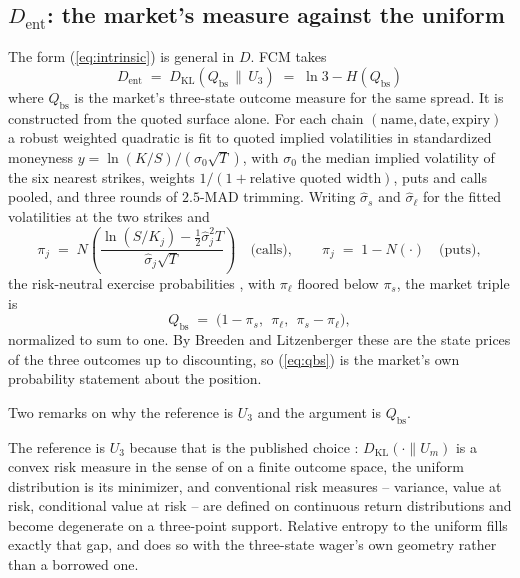 \documentclass[11pt]{article}
\newcommand{\dkl}{D_{\mathrm{KL}}}
\newcommand{\dent}{D_{\mathrm{ent}}}
\newcommand{\Qbs}{Q_{\mathrm{bs}}}
\begin{document}
\subsection{\texorpdfstring{$\dent$}{D-ent}: the market's measure against the
uniform}
\label{sec:dent}

The form (\ref{eq:intrinsic}) is general in $D$. FCM takes
\begin{equation}
\boxed{\ \dent \;=\; \dkl(\Qbs \,\|\, U_3) \;=\; \ln 3 - H(\Qbs)\ }
\label{eq:dent}
\end{equation}
where $\Qbs$ is the market's three-state outcome measure for the same spread.
It is constructed from the quoted surface alone. For each chain
$(\text{name}, \text{date}, \text{expiry})$ a robust weighted quadratic is fit
to quoted implied volatilities in standardized moneyness
$y = \ln(K/S)/(\sigma_0\sqrt{T})$, with $\sigma_0$ the median implied
volatility of the six nearest strikes, weights
$1/(1 + \text{relative quoted width})$, puts and calls pooled, and three
rounds of $2.5$-MAD trimming. Writing $\hat\sigma_s$ and $\hat\sigma_\ell$ for
the fitted volatilities at the two strikes and
\begin{equation}
\pi_j \;=\; N\!\left(\frac{\ln(S/K_j) - \tfrac12\hat\sigma_j^2 T}
{\hat\sigma_j\sqrt{T}}\right)
\quad\text{(calls)}, \qquad
\pi_j \;=\; 1 - N(\cdot) \quad\text{(puts)},
\label{eq:nd2}
\end{equation}
the risk-neutral exercise probabilities \cite{blackscholes1973, merton1973},
with $\pi_\ell$ floored below $\pi_s$, the market triple is
\begin{equation}
\Qbs \;=\; \bigl(1 - \pi_s,\ \ \pi_\ell,\ \ \pi_s - \pi_\ell\bigr),
\label{eq:qbs}
\end{equation}
normalized to sum to one. By Breeden and Litzenberger \cite{breeden1978} these
are the state prices of the three outcomes up to discounting, so
(\ref{eq:qbs}) is the market's own probability statement about the position.

Two remarks on why the reference is $U_3$ and the argument is $\Qbs$.

The reference is $U_3$ because that is the published choice
\cite{mercurio2020binary, mercurio2020gepo}: $\dkl(\cdot \| U_m)$ is a convex
risk measure in the sense of \cite{follmer2002} on a finite outcome space, the
uniform distribution is its minimizer, and conventional risk measures --
variance, value at risk, conditional value at risk -- are defined on
continuous return distributions and become degenerate on a three-point
support. Relative entropy to the uniform fills exactly that gap, and does so
with the three-state wager's own geometry rather than a borrowed one.
\end{document}
